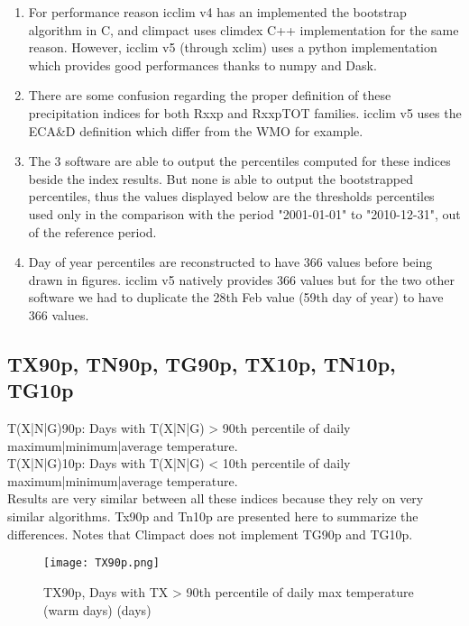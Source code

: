 \documentclass[a4paper,11pt]{article}
\begin{document}
        \begin{enumerate}
            \item For performance reason icclim v4 has an implemented the bootstrap algorithm in C, and climpact uses climdex C++ implementation for the same reason. However, icclim v5 (through xclim) uses a python implementation which provides good performances thanks to numpy and Dask.
            \item There are some confusion regarding the proper definition of these precipitation indices for both Rxxp and RxxpTOT families. icclim v5 uses the ECA\&D definition which differ from the WMO for example.
            \item The 3 software are able to output the percentiles computed for these indices beside the index results. But none is able to output the bootstrapped percentiles, thus the values displayed below are the thresholds percentiles used only in the comparison with the period "2001-01-01" to "2010-12-31", out of the reference period.
            \item Day of year percentiles are reconstructed to have 366 values before being drawn in figures. icclim v5 natively provides 366 values but for the two other software we had to duplicate the 28th Feb value (59th day of year) to have 366 values.
        \end{enumerate}


    \subsection{TX90p, TN90p, TG90p, TX10p, TN10p, TG10p}
        T(X|N|G)90p: Days with T(X|N|G) > 90th percentile of daily maximum|minimum|average temperature.\\
        T(X|N|G)10p: Days with T(X|N|G) < 10th percentile of daily maximum|minimum|average temperature.\\

        Results are very similar between all these indices because they rely on very similar algorithms. 
        Tx90p and Tn10p are presented here to summarize the differences.
        Notes that Climpact does not implement TG90p and TG10p.

        \begin{figure}[!hbt]
            \centering
            \texttt{[image: TX90p.png]}
            \caption{TX90p, Days with TX > 90th percentile of daily max temperature (warm days) (days)}
            \label{figure/tx90p}
        \end{figure}
\end{document}
